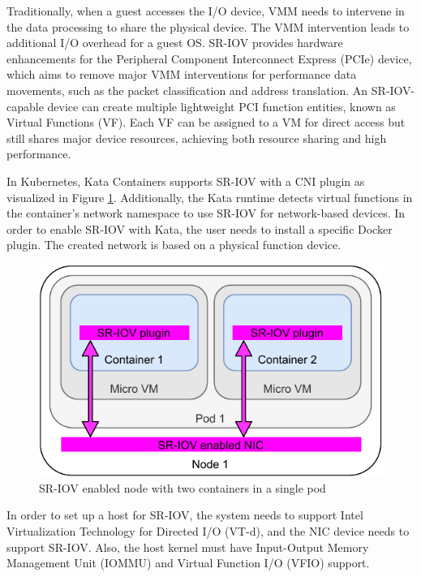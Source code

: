Traditionally, when a guest accesses the I/O device, VMM needs to intervene in the data processing to share the physical device. The VMM intervention leads to additional I/O overhead for a guest OS. SR-IOV provides hardware enhancements for the Peripheral Component Interconnect Express (PCIe) device, which aims to remove major VMM interventions for performance data movements, such as the packet classification and address translation. An SR-IOV-capable device can create multiple lightweight PCI function entities, known as Virtual Functions (VF). Each VF can be assigned to a VM for direct access but still shares major device resources, achieving both resource sharing and high performance. \cite{Dong2012}

In Kubernetes, Kata Containers supports SR-IOV with a CNI plugin \cite{SR-IOVOpenShift} as visualized in Figure \ref{fig:SR-IOVNode}. Additionally, the Kata runtime detects virtual functions in the container's network namespace to use SR-IOV for network-based devices. In order to enable SR-IOV with Kata, the user needs to install a specific Docker plugin. The created network is based on a physical function device. \cite{SR-IOVKataContainers}

\begin{figure}[ht]
  \begin{center}
    \includegraphics[width=13.5cm]{images/SR-IOVNode.pdf}
    \caption{SR-IOV enabled node with two containers in a single pod}
    \label{fig:SR-IOVNode}
  \end{center}
\end{figure}

In order to set up a host for SR-IOV, the system needs to support Intel Virtualization Technology for Directed I/O (VT-d), and the NIC device needs to support SR-IOV. Also, the host kernel must have Input-Output Memory Management Unit (IOMMU) and Virtual Function I/O (VFIO) support.

